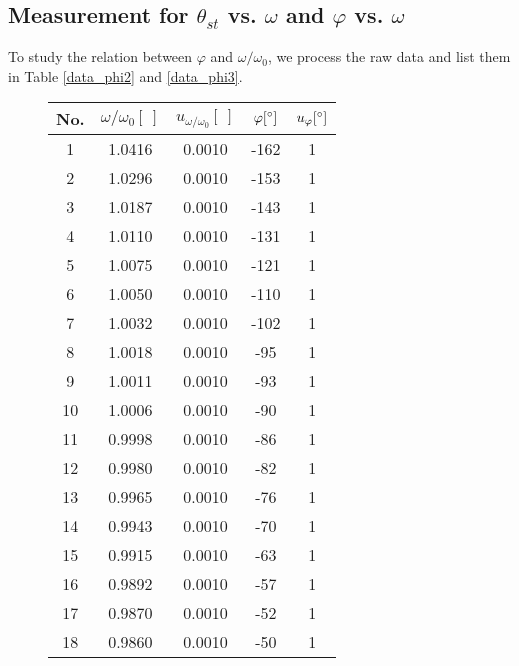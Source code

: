 \subsection{Measurement for $\theta_{st}$ vs. $\omega$ and $\varphi$ vs. $\omega$}
    To study the relation between $\varphi$ and $\omega/\omega_0$, we process the raw data and list them in Table \ref{data_phi2} and \ref{data_phi3}.
    \begin{figure}[H]
    \centering
    \begin{minipage}{0.4\textwidth}
        \begin{table}[H]
        \centering
            \begin{tabular}{|c|c|c|c|c|}
                \hline
                No. & $\omega/\omega_0[\ ]$ & $u_{\omega/\omega_0}[\ ]$ & $\varphi[^\circ]$ & $u_{\varphi}[^\circ]$\\\hline
                1 & 1.0416 & 0.0010 & -162 & 1\\\hline
                2 & 1.0296 & 0.0010 & -153 & 1\\\hline
                3 & 1.0187 & 0.0010 & -143 & 1\\\hline
                4 & 1.0110 & 0.0010 & -131 & 1\\\hline
                5 & 1.0075 & 0.0010 & -121 & 1\\\hline
                6 & 1.0050 & 0.0010 & -110 & 1\\\hline
                7 & 1.0032 & 0.0010 & -102 & 1\\\hline
                8 & 1.0018 & 0.0010 & -95 & 1\\\hline
                9 & 1.0011 & 0.0010 & -93 & 1\\\hline
                10 & 1.0006 & 0.0010 & -90 & 1\\\hline
                11 & 0.9998 & 0.0010 & -86 & 1\\\hline
                12 & 0.9980 & 0.0010 & -82 & 1\\\hline
                13 & 0.9965 & 0.0010 & -76 & 1\\\hline
                14 & 0.9943 & 0.0010 & -70 & 1\\\hline
                15 & 0.9915 & 0.0010 & -63 & 1\\\hline
                16 & 0.9892 & 0.0010 & -57 & 1\\\hline
                17 & 0.9870 & 0.0010 & -52 & 1\\\hline
                18 & 0.9860 & 0.0010 & -50 & 1\\\hline

\end{tabular}
\end{table}
\end{minipage}
\end{figure}

